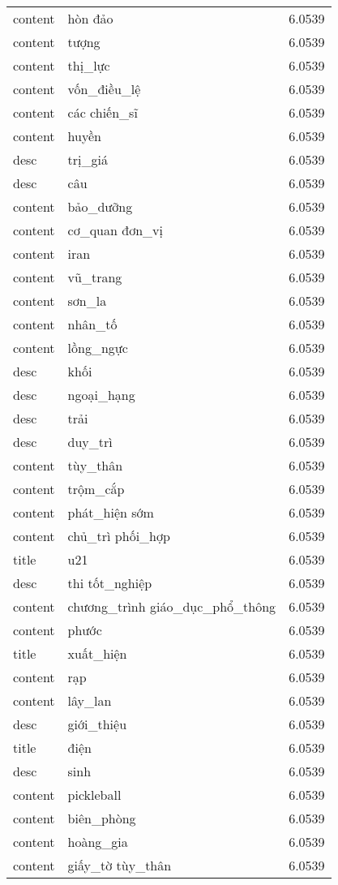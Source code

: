 \documentclass{article}
\begin{document}
\begin{tabular}{lll}
content & hòn đảo & 6.0539\\
content & tượng & 6.0539\\
content & thị\_lực & 6.0539\\
content & vốn\_điều\_lệ & 6.0539\\
content & các chiến\_sĩ & 6.0539\\
content & huyền & 6.0539\\
desc & trị\_giá & 6.0539\\
desc & câu & 6.0539\\
content & bảo\_dưỡng & 6.0539\\
content & cơ\_quan đơn\_vị & 6.0539\\
content & iran & 6.0539\\
content & vũ\_trang & 6.0539\\
content & sơn\_la & 6.0539\\
content & nhân\_tố & 6.0539\\
content & lồng\_ngực & 6.0539\\
desc & khối & 6.0539\\
desc & ngoại\_hạng & 6.0539\\
desc & trải & 6.0539\\
desc & duy\_trì & 6.0539\\
content & tùy\_thân & 6.0539\\
content & trộm\_cắp & 6.0539\\
content & phát\_hiện sớm & 6.0539\\
content & chủ\_trì phối\_hợp & 6.0539\\
title & u21 & 6.0539\\
desc & thi tốt\_nghiệp & 6.0539\\
content & chương\_trình giáo\_dục\_phổ\_thông & 6.0539\\
content & phước & 6.0539\\
title & xuất\_hiện & 6.0539\\
content & rạp & 6.0539\\
content & lây\_lan & 6.0539\\
desc & giới\_thiệu & 6.0539\\
title & điện & 6.0539\\
desc & sinh & 6.0539\\
content & pickleball & 6.0539\\
content & biên\_phòng & 6.0539\\
content & hoàng\_gia & 6.0539\\
content & giấy\_tờ tùy\_thân & 6.0539\\

\end{tabular}
\end{document}
